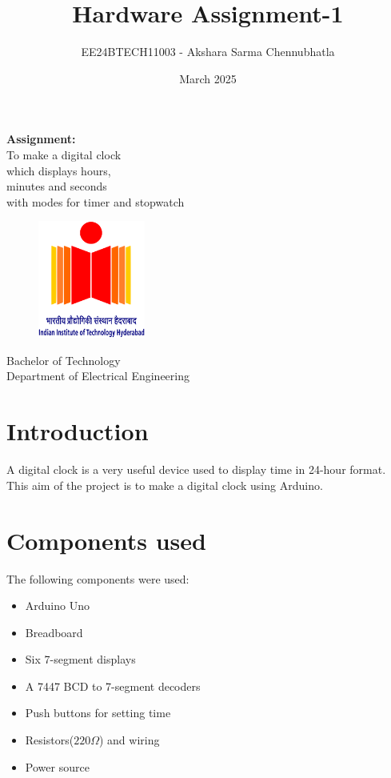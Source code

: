 \documentclass[a4paper,12pt]{article}
\title{Hardware Assignment-1}
\author{EE24BTECH11003 - Akshara Sarma Chennubhatla}
\date{March 2025}
\begin{document}
\maketitle
\begin{center}
	\textbf{Assignment:}\\To make a digital clock\\which displays hours,\\minutes and seconds\\with modes for timer and stopwatch
\end{center}
\vspace{30pt}
\begin{figure}[h!]
	\centering
	\includegraphics[width = 100pt]{.logo/logo.png}\\
\end{figure}
\begin{center}
	Bachelor of Technology\\
	\vspace{10pt}
	Department of Electrical Engineering\\
\end{center}
\newpage

\maketitle


\tableofcontents
\newpage  

\section{Introduction}
A digital clock is a very useful device used to display time in 24-hour format. This aim of the project is to make a digital clock using  Arduino.

\section{Components used}
The following components were used:
\begin{itemize}
    \item Arduino Uno
    \item Breadboard
    \item Six 7-segment displays
    \item A 7447 BCD to 7-segment decoders
    \item Push buttons for setting time
    \item Resistors($220 \Omega$) and wiring
    \item Power source
\end{itemize}
\end{document}
